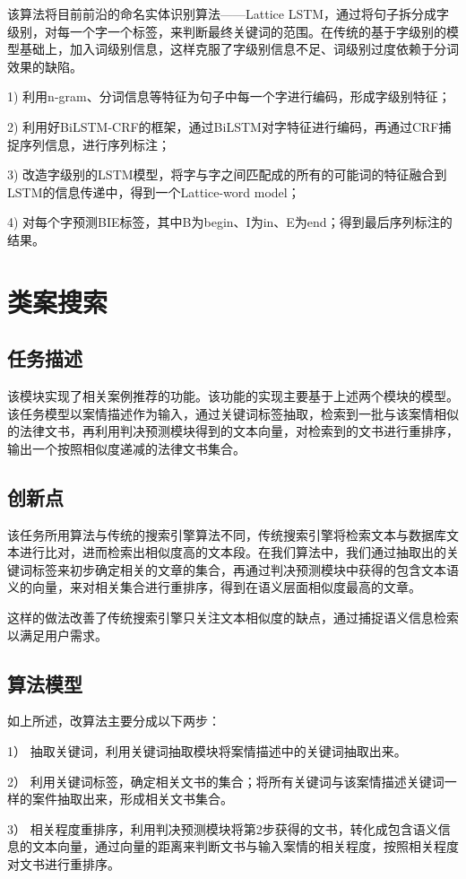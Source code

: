 该算法将目前前沿的命名实体识别算法——Lattice LSTM，通过将句子拆分成字级别，对每一个字一个标签，来判断最终关键词的范围。在传统的基于字级别的模型基础上，加入词级别信息，这样克服了字级别信息不足、词级别过度依赖于分词效果的缺陷。

1)	利用n-gram、分词信息等特征为句子中每一个字进行编码，形成字级别特征；

2)	利用好BiLSTM-CRF的框架，通过BiLSTM对字特征进行编码，再通过CRF捕捉序列信息，进行序列标注；

3)	改造字级别的LSTM模型，将字与字之间匹配成的所有的可能词的特征融合到LSTM的信息传递中，得到一个Lattice-word model；

4)	对每个字预测BIE标签，其中B为begin、I为in、E为end；得到最后序列标注的结果。



\section{类案搜索}
\subsection{任务描述}
该模块实现了相关案例推荐的功能。该功能的实现主要基于上述两个模块的模型。该任务模型以案情描述作为输入，通过关键词标签抽取，检索到一批与该案情相似的法律文书，再利用判决预测模块得到的文本向量，对检索到的文书进行重排序，输出一个按照相似度递减的法律文书集合。

\subsection{创新点}
该任务所用算法与传统的搜索引擎算法不同，传统搜索引擎将检索文本与数据库文本进行比对，进而检索出相似度高的文本段。在我们算法中，我们通过抽取出的关键词标签来初步确定相关的文章的集合，再通过判决预测模块中获得的包含文本语义的向量，来对相关集合进行重排序，得到在语义层面相似度最高的文章。

这样的做法改善了传统搜索引擎只关注文本相似度的缺点，通过捕捉语义信息检索以满足用户需求。

\subsection{算法模型}
如上所述，改算法主要分成以下两步：

1）	抽取关键词，利用关键词抽取模块将案情描述中的关键词抽取出来。

2）	利用关键词标签，确定相关文书的集合；将所有关键词与该案情描述关键词一样的案件抽取出来，形成相关文书集合。

3）	相关程度重排序，利用判决预测模块将第2步获得的文书，转化成包含语义信息的文本向量，通过向量的距离来判断文书与输入案情的相关程度，按照相关程度对文书进行重排序。



